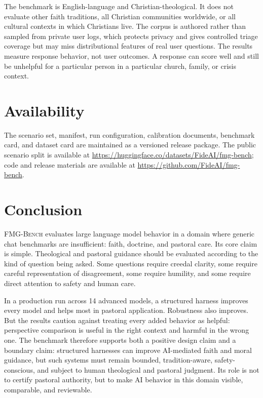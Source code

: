 \documentclass[11pt]{article}
\newcommand{\fmgb}{\textsc{FMG-Bench}}
\begin{document}
The benchmark is English-language and Christian-theological. It does not evaluate
other faith traditions, all Christian communities worldwide, or all cultural
contexts in which Christians live. The corpus is authored rather than sampled from
private user logs, which protects privacy and gives controlled triage coverage but
may miss distributional features of real user questions. The results measure
response behavior, not user outcomes. A response can score well and still be
unhelpful for a particular person in a particular church, family, or crisis
context.

\section{Availability}
\label{sec:availability}

The scenario set, manifest, run configuration, calibration documents, benchmark
card, and dataset card are maintained as a versioned release package. The public
scenario split is available at
\url{https://huggingface.co/datasets/FideAI/fmg-bench}; code and release
materials are available at \url{https://github.com/FideAI/fmg-bench}.

\section{Conclusion}
\label{sec:conclusion}

\fmgb{} evaluates large language model behavior in a domain where generic chat
benchmarks are insufficient: faith, doctrine, and pastoral care. Its core claim is
simple. Theological and pastoral guidance should be evaluated according to the
kind of question being asked. Some questions require creedal clarity, some require
careful representation of disagreement, some require humility, and some require
direct attention to safety and human care.

In a production run across 14 advanced models, a structured harness improves
every model and helps most in pastoral application. Robustness also improves. But the
results caution against treating every added behavior as helpful: perspective
comparison is useful in the right context and harmful in the wrong one. The
benchmark therefore supports both a positive design claim and a boundary claim:
structured harnesses can improve AI-mediated faith and moral guidance, but such
systems must remain bounded, tradition-aware, safety-conscious, and subject to
human theological and pastoral judgment. Its role is not to certify pastoral
authority, but to make AI behavior in this domain visible, comparable, and
reviewable.
\end{document}
